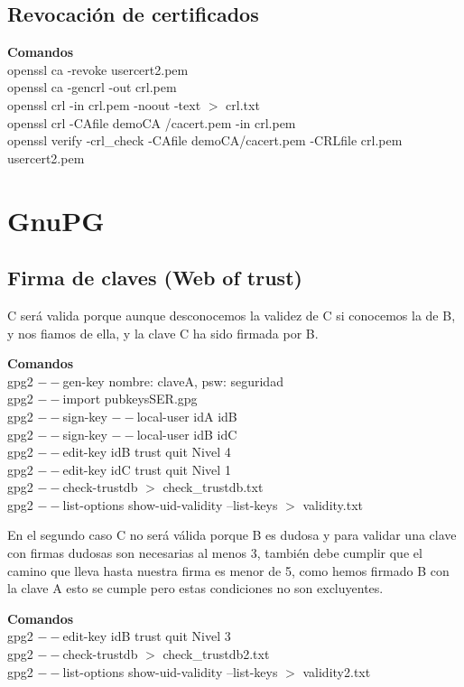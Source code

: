 \documentclass[11pt]{article}
\begin{document}
    \subsection{Revocación de certificados}
      \par
      \textbf{Comandos}\\
      openssl ca -revoke usercert2.pem\\
      openssl ca -gencrl -out crl.pem\\
      openssl crl -in crl.pem -noout -text $>$ crl.txt\\
      openssl crl -CAfile demoCA /cacert.pem -in crl.pem\\
      openssl verify -crl\_check -CAfile demoCA/cacert.pem -CRLfile crl.pem usercert2.pem

  \section{GnuPG}
    \subsection{Firma de claves (Web of trust)}
      \par
      C será valida porque aunque desconocemos la validez de C si conocemos la de B, y nos
      fiamos de ella, y la clave C ha sido firmada por B.
      \par
      \textbf{Comandos}\\
      gpg2 $--$gen-key \hspace{10mm} nombre: claveA, psw: seguridad\\
      gpg2 $--$import pubkeysSER.gpg\\
      gpg2 $--$sign-key $--$local-user idA idB\\
      gpg2 $--$sign-key $--$local-user idB idC\\
      gpg2 $--$edit-key idB trust quit \hspace{10mm} Nivel 4\\
      gpg2 $--$edit-key idC trust quit \hspace{10mm} Nivel 1\\
      gpg2 $--$check-trustdb $>$ check\_trustdb.txt\\
      gpg2 $--$list-options show-uid-validity --list-keys $>$ validity.txt\\

      \bigskip
      \par
      En el segundo caso C no será válida porque B es dudosa y para validar una clave con firmas
      dudosas son necesarias al menos 3, también debe cumplir que el camino que lleva hasta nuestra
      firma es menor de 5, como hemos firmado B con la clave A esto se cumple pero estas condiciones
      no son excluyentes.
      \par
      \textbf{Comandos}\\
      gpg2 $--$edit-key idB trust quit \hspace{10mm} Nivel 3\\
      gpg2 $--$check-trustdb $>$ check\_trustdb2.txt\\
      gpg2 $--$list-options show-uid-validity --list-keys $>$ validity2.txt\\
\end{document}
